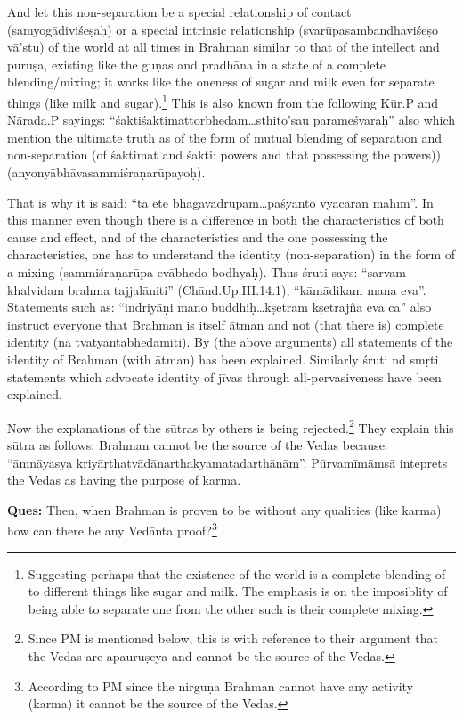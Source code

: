 And let this non-separation be a special relationship of contact (samyogādiviśeṣaḥ) or a special intrinsic relationship (svarūpasambandhaviśeṣo vā’stu) of the world at all times in Brahman similar to that of the intellect and puruṣa, existing like the guṇas and pradhāna in a state of a complete blending/mixing; it works like the oneness of sugar and milk even for separate things (like milk and sugar).\footnote{Suggesting perhaps that the existence of the world is a complete blending of to different things like sugar and milk. The emphasis is on the imposiblity of being able to separate one from the other such is their complete mixing.} This is also known from the following Kūr.P and Nārada.P sayings: “śaktiśaktimattorbhedam…sthito’sau parameśvaraḥ” also which mention the ultimate truth as of the form of mutual blending of separation and non-separation (of śaktimat and śakti: powers and that possessing the powers)) (anyonyābhāvasammiśraṇarūpayoḥ).

That is why it is said: “ta ete bhagavadrūpam…paśyanto vyacaran mahīm”. In this manner even though there is a difference in both the characteristics of both cause and effect, and of the characteristics and the one possessing the characteristics, one has to understand the identity (non-separation) in the form of a mixing (sammiśraṇarūpa evābhedo bodhyaḥ). Thus śruti says: “sarvam khalvidam brahma tajjalāniti” (Chānd.Up.III.14.1), “kāmādikam mana eva”. Statements such as: “indriyāṇi mano buddhiḥ…kṣetram kṣetrajña eva ca” also instruct everyone that Brahman is itself ātman and not (that there is) complete identity (na tvātyantābhedamiti). By (the above arguments) all statements of the identity of Brahman (with ātman) has been explained. Similarly śruti nd smṛti statements which advocate identity of jīvas through all-pervasiveness have been explained.

Now the explanations of the sūtras by others is being rejected.\footnote{Since PM is mentioned below, this is with reference to their argument that the Vedas are apauruṣeya and cannot be the source of the Vedas.} They explain this sūtra as follows: Brahman cannot be the source of the Vedas because: “āmnāyasya kriyāṛthatvādānarthakyamatadarthā\-nām”. Pūrvamīmāmsā inteprets the Vedas as having the purpose of karma. 

\textbf{Ques:} Then, when Brahman is proven to be without any qualities (like karma) how can there be any Vedānta proof?\footnote{According to PM since the nirguṇa Brahman cannot have any activity (karma) it cannot be the source of the Vedas.}

